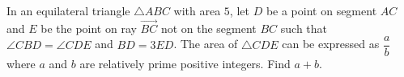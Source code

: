 In an equilateral triangle $\triangle ABC$ with area $5$, let $D$ be a point on segment $AC$ and $E$ be the point on ray $\overrightarrow{BC}$ not on the segment $BC$ such that $\angle CBD=\angle CDE$ and $BD=3ED$. The area of $\triangle CDE$ can be expressed as $\dfrac{a}{b}$ where $a$ and $b$ are relatively prime positive integers. Find $a+b$.
